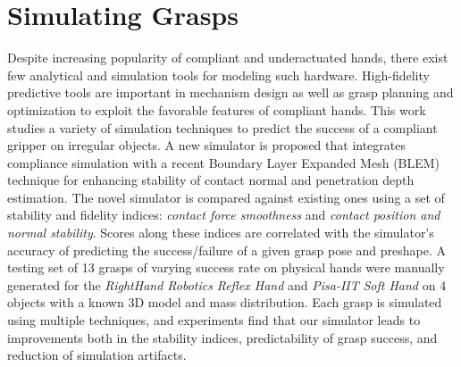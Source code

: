 \section{Simulating Grasps}

Despite increasing popularity of compliant and underactuated hands, there exist few analytical and simulation tools for modeling such hardware.  High-fidelity predictive tools are important in mechanism design as well as grasp planning and optimization to exploit the favorable features of compliant hands.
This work\cite{Rocchi2016-jq} studies a variety of simulation techniques to predict the success of a compliant gripper on irregular objects.  A new simulator is proposed that integrates compliance simulation with a recent Boundary Layer Expanded Mesh (BLEM) technique for enhancing stability of contact normal and penetration depth estimation.
The novel simulator is compared against existing ones using a set of stability and fidelity indices: \emph{contact force smoothness} and \emph{contact position and normal stability}.
Scores along these indices are correlated with the simulator's accuracy of predicting the success/failure of a given grasp pose and preshape.  
A testing set of 13 grasps of varying success rate on physical hands were manually generated for the  \emph{RightHand Robotics} \emph{Reflex Hand} and \emph{Pisa-IIT} \emph{Soft Hand} on $4$ objects with a known 3D model and mass distribution. 
Each grasp is simulated using multiple techniques, and experiments find that our simulator leads to improvements both in the stability indices, predictability of grasp success, and reduction of simulation artifacts.


